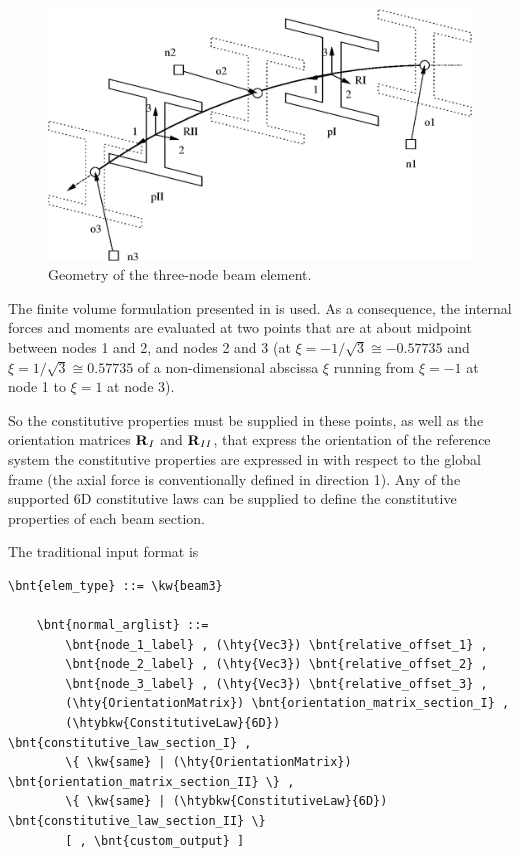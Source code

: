 \begin{figure}
\centering
{}
\includegraphics[width=.7\textwidth]{beam3}
\caption{Geometry of the three-node beam element.}
\label{fig:EL:BEAM:beam3}
\end{figure}

The finite volume formulation presented in \cite{FV-AIAA} is used.
As a consequence, the internal forces and moments are evaluated 
at two points that are at about midpoint between nodes 1 and 2, 
and nodes 2 and 3 (at $ \xi=-1/\sqrt{3}\cong -0.57735 $
and $\xi=1/\sqrt{3} \cong 0.57735$ of a non-dimensional abscissa $\xi$
running from $\xi=-1$ at node 1 to $\xi=1$ at node 3).

So the constitutive properties must be supplied in these points, as well as
the orientation matrices $\bm{\mathbf R}_I$ and $\bm{\mathbf R}_{II}$,
that express the orientation of the reference system
the constitutive properties are expressed in with respect to the global frame
(the axial force is conventionally defined in direction 1).
Any of the supported 6D constitutive laws can be supplied to define the
constitutive properties of each beam section.

The traditional input format is
\begin{Verbatim}[commandchars=\\\{\}]
    \bnt{elem_type} ::= \kw{beam3}

    \bnt{normal_arglist} ::=
        \bnt{node_1_label} , (\hty{Vec3}) \bnt{relative_offset_1} ,
        \bnt{node_2_label} , (\hty{Vec3}) \bnt{relative_offset_2} ,
        \bnt{node_3_label} , (\hty{Vec3}) \bnt{relative_offset_3} ,
        (\hty{OrientationMatrix}) \bnt{orientation_matrix_section_I} ,
        (\htybkw{ConstitutiveLaw}{6D}) \bnt{constitutive_law_section_I} ,
        \{ \kw{same} | (\hty{OrientationMatrix}) \bnt{orientation_matrix_section_II} \} ,
        \{ \kw{same} | (\htybkw{ConstitutiveLaw}{6D}) \bnt{constitutive_law_section_II} \}
        [ , \bnt{custom_output} ]
\end{Verbatim}


